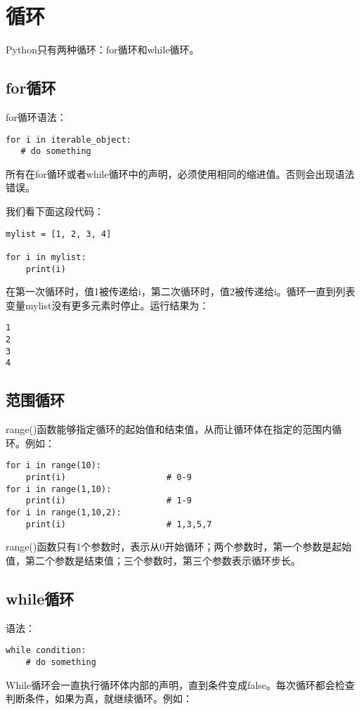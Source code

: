 \section{循环}

Python只有两种循环：for循环和while循环。

\subsection{for循环}
for循环语法：
\begin{lstlisting}
for i in iterable_object:
   # do something
\end{lstlisting}
\begin{myremark}{}
所有在for循环或者while循环中的声明，必须使用相同的缩进值。否则会出现语法错误。
\end{myremark}
我们看下面这段代码：

\begin{lstlisting}
mylist = [1, 2, 3, 4]

for i in mylist:
    print(i)
\end{lstlisting}
在第一次循环时，值1被传递给i，第二次循环时，值2被传递给i。循环一直到列表变量mylist没有更多元素时停止。运行结果为：

\begin{lstlisting}
1
2
3
4
\end{lstlisting}

\subsection{范围循环}
range()函数能够指定循环的起始值和结束值，从而让循环体在指定的范围内循环。例如：

\begin{lstlisting}
for i in range(10):
    print(i) 					# 0-9
for i in range(1,10):
    print(i) 					# 1-9
for i in range(1,10,2):
    print(i) 					# 1,3,5,7
\end{lstlisting}
range()函数只有1个参数时，表示从0开始循环；两个参数时，第一个参数是起始值，第二个参数是结束值；三个参数时，第三个参数表示循环步长。

\subsection{while循环}
语法：

\begin{lstlisting}
while condition:
    # do something
\end{lstlisting}

While循环会一直执行循环体内部的声明，直到条件变成false。每次循环都会检查判断条件，如果为真，就继续循环。例如：

